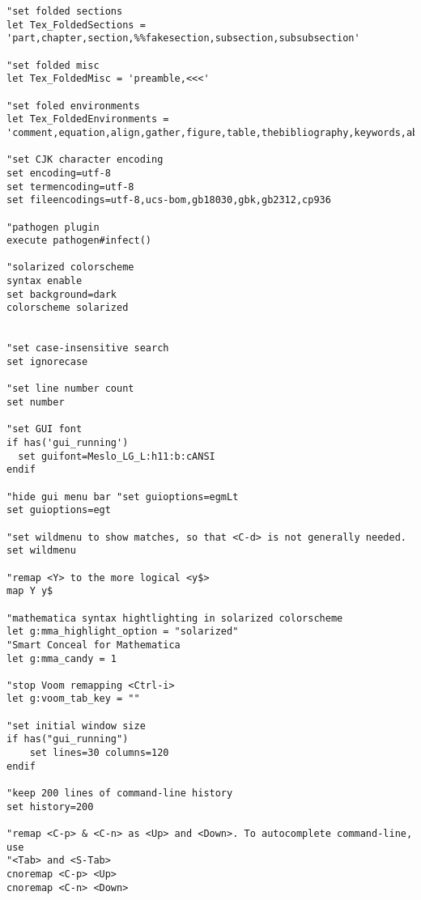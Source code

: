\documentclass{article}
\begin{document}
{\begin{verbatim}
"set folded sections
let Tex_FoldedSections = 'part,chapter,section,%%fakesection,subsection,subsubsection'

"set folded misc
let Tex_FoldedMisc = 'preamble,<<<'

"set foled environments
let Tex_FoldedEnvironments = 'comment,equation,align,gather,figure,table,thebibliography,keywords,abstract,titlepage'

"set CJK character encoding
set encoding=utf-8
set termencoding=utf-8
set fileencodings=utf-8,ucs-bom,gb18030,gbk,gb2312,cp936

"pathogen plugin
execute pathogen#infect()

"solarized colorscheme
syntax enable
set background=dark
colorscheme solarized


"set case-insensitive search
set ignorecase

"set line number count
set number

"set GUI font
if has('gui_running')
  set guifont=Meslo_LG_L:h11:b:cANSI
endif

"hide gui menu bar "set guioptions=egmLt
set guioptions=egt

"set wildmenu to show matches, so that <C-d> is not generally needed.
set wildmenu

"remap <Y> to the more logical <y$>
map Y y$

"mathematica syntax hightlighting in solarized colorscheme
let g:mma_highlight_option = "solarized"
"Smart Conceal for Mathematica
let g:mma_candy = 1

"stop Voom remapping <Ctrl-i>
let g:voom_tab_key = ""

"set initial window size
if has("gui_running")
	set lines=30 columns=120
endif

"keep 200 lines of command-line history
set history=200

"remap <C-p> & <C-n> as <Up> and <Down>. To autocomplete command-line, use
"<Tab> and <S-Tab>
cnoremap <C-p> <Up>
cnoremap <C-n> <Down>
\end{verbatim}
}
\end{document}
